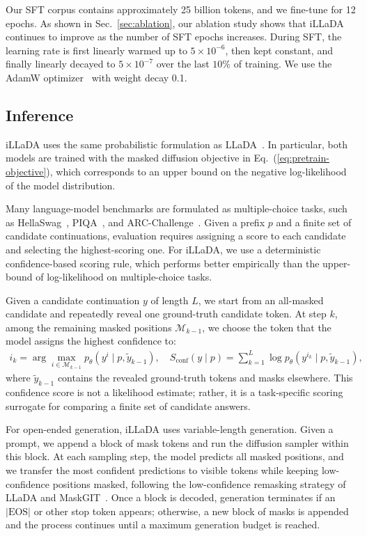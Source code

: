 \documentclass{llmxive}
\begin{document}
Our SFT corpus contains approximately 25 billion tokens, and we fine-tune for 12 epochs. As shown in Sec.~\ref{sec:ablation}, our ablation study shows that iLLaDA continues to improve as the number of SFT epochs increases. During SFT, the learning rate is first linearly warmed up to \(5 \times 10^{-6}\), then kept constant, and finally linearly decayed to \(5 \times 10^{-7}\) over the last \(10\%\) of training. We use the AdamW optimizer~\citep{loshchilov2017decoupled} with weight decay 0.1.

\subsection{Inference}
\label{sec:inference}

iLLaDA uses the same probabilistic formulation as LLaDA~\citep{nie2026large}. In particular, both models are trained with the masked diffusion objective in Eq.~(\ref{eq:pretrain-objective}), which corresponds to an upper bound on the negative log-likelihood of the
model distribution.

Many language-model benchmarks are formulated as multiple-choice tasks, such as HellaSwag~\citep{zellers2019hellaswag}, PIQA~\citep{bisk2020piqa}, and ARC-Challenge~\citep{clark2018think}. Given a prefix \(p\) and a finite set of candidate continuations, evaluation requires assigning a score to each candidate and selecting the highest-scoring one. For iLLaDA, we use a deterministic confidence-based scoring rule, which performs better empirically than the upper-bound of log-likelihood on multiple-choice tasks.

Given a candidate continuation \(y\) of length \(L\), we start from an all-masked candidate and repeatedly reveal one ground-truth candidate token. At step \(k\), among the remaining masked positions \(\mathcal{M}_{k-1}\), we choose the token that the model assigns the highest confidence to:
\begin{align}
\label{eq:confidence-score}
i_k
=
\arg\max_{i \in \mathcal{M}_{k-1}}
p_{\theta}(y^i \mid p, \tilde{y}_{k-1}),
\quad
S_{\mathrm{conf}}(y \mid p)
=
\sum_{k=1}^{L}
\log p_{\theta}(y^{i_k} \mid p, \tilde{y}_{k-1}),
\end{align}
where \(\tilde{y}_{k-1}\) contains the revealed ground-truth tokens and masks elsewhere. This confidence score is not a likelihood estimate; rather, it is a task-specific scoring surrogate for comparing a finite set of candidate answers.

For open-ended generation, iLLaDA uses variable-length generation. Given a prompt, we append a block of mask tokens and run the diffusion sampler within this block. At each sampling step, the model predicts all masked positions, and we transfer the most confident predictions to visible tokens while keeping low-confidence positions masked, following the low-confidence remasking strategy of LLaDA and MaskGIT~\citep{chang2022maskgit}. Once a block is decoded, generation terminates if an \( |\text{EOS}| \) or other stop token appears; otherwise, a new block of masks is appended and the process continues until a maximum generation budget is reached. 
\end{document}
